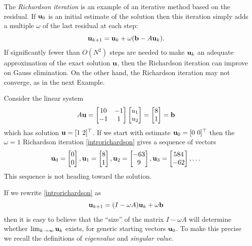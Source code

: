The \emph{Richardson iteration} is an example of an iterative method based on the residual.  If $\mathbf{u}_0$ is an initial estimate of the solution then this iteration simply adds a multiple $\omega$ of the last residual at each step:
\begin{equation}
\mathbf{u}_{k+1} = \mathbf{u}_k + \omega (\mathbf{b} - A \mathbf{u}_k).  \label{introrichardson}
\end{equation}
If significantly fewer than $O(N^2)$ steps are needed to make $\mathbf{u}_k$ an adequate approximation of the exact solution $\mathbf{u}$, then the Richardson iteration can improve on Gauss elimination.  On the other hand, the Richardson iteration may not converge, as in the next Example.

\newcommand{\rvect}[3]{\ensuremath{\bu_{#1} = \begin{bmatrix} #2 \\ #3 \end{bmatrix}}}

\medskip\noindent\hrulefill
\begin{example} Consider the linear system
\begin{equation}
A \mathbf{u}
= \begin{bmatrix}
10 & -1 \\ -1 & 1
\end{bmatrix}
\begin{bmatrix} u_1 \\ u_2 \end{bmatrix}
= \begin{bmatrix} 8 \\ 1 \end{bmatrix}
= \mathbf{b}
 \label{introexample}
\end{equation}
which has solution $\mathbf{u} = [1\,\, 2]^\top$.  If we start with estimate $\mathbf{u}_0 = [0\,\, 0]^\top$ then the $\omega=1$ Richardson iteration \eqref{introrichardson} gives a sequence of vectors %
\begin{equation}
\rvect{0}{0}{0}, \rvect{1}{8}{1}, \rvect{2}{-63}{9}, \rvect{3}{584}{-62}, \dots
\end{equation}
This sequence is not heading toward the solution.
\end{example}
\noindent\hrulefill

\medskip
If we rewrite \eqref{introrichardson} as
\begin{equation}
\mathbf{u}_{k+1} = (I - \omega A) \mathbf{u}_k + \omega \mathbf{b}  \label{introrewriterichardson}
\end{equation}
then it is easy to believe that the ``size'' of the matrix $I-\omega A$ will determine whether $\lim_{k\to\infty} \mathbf{u}_k$ exists, for generic starting vectors $\mathbf{u}_0$.  To make this precise we recall the definitions of \emph{eigenvalue} and \emph{singular value}.

